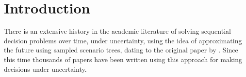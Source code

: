\documentclass[11pt,oneside,fleqn,reqno,titlepage]{article}
\newcommand{\doublespacerestore}{\addtolength{\baselineskip}{1.25\baselineskip}}
\newcommand{\singlespace}{\addtolength{\baselineskip}{-.5\baselineskip}}
\begin{document}



\thispagestyle{empty}

\singlespace

\doublespacerestore

\clearpage
\setcounter{page}{1}
\pagestyle{plain}


\section{Introduction}
There is an extensive history in the academic literature of solving sequential decision problems over time, under uncertainty, using the idea of approximating the future using sampled scenario trees, dating to the original paper by \cite{Da55}. Since this time thousands of papers have been written using this approach for making decisions under uncertainty.
\end{document}
